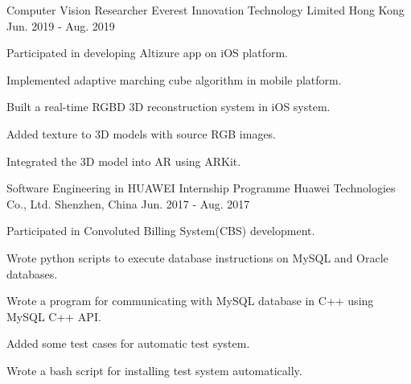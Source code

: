 


\begin{cventries}

\cventry
{Computer Vision Researcher} %
{Everest Innovation Technology Limited} %
{Hong Kong} %
{Jun. 2019 - Aug. 2019} %
{ %
\begin{cvitems}
\item {Participated in developing Altizure app on iOS platform.}
\item {Implemented adaptive marching cube algorithm in mobile platform.}
\item {Built a real-time RGBD 3D reconstruction system in iOS system.}
\item {Added texture to 3D models with source RGB images.}
\item {Integrated the 3D model into AR using ARKit.}
\end{cvitems}
}



\cventry
{Software Engineering in HUAWEI Internship Programme} %
{Huawei Technologies Co., Ltd.} %
{Shenzhen, China} %
{Jun. 2017 - Aug. 2017} %
{ %
\begin{cvitems}
\item {Participated in Convoluted Billing System(CBS) development.}
\item {Wrote python scripts to execute database instructions on MySQL and Oracle databases.}
\item {Wrote a program for communicating with MySQL database in C++ using MySQL C++ API.}
\item {Added some test cases for automatic test system.}
\item {Wrote a bash script for installing test system automatically.}
\end{cvitems}
}



\end{cventries}

